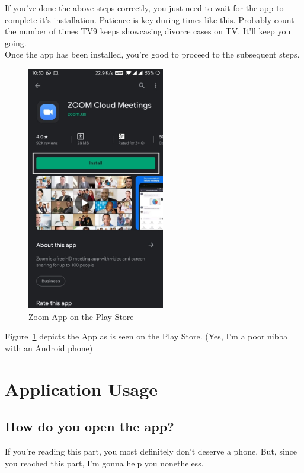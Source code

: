 \documentclass[14pt]{report}
\begin{document}
                    If you've done the above steps correctly, you just need to wait for the app to complete it's installation. Patience is key during times like this. Probably count the number of times TV9 keeps showcasing divorce cases on TV. It'll keep you going.\\

                    Once the app has been installed, you're good to proceed to the subsequent steps.\\
                    \begin{figure}[H]
						\includegraphics[width=6cm]{ZoomApp.jpeg}
						\centering
                        \caption{Zoom App on the Play Store}
                        \label{fig:ZoomApp}
					\end{figure}

                    Figure~\ref{fig:ZoomApp} depicts the App as is seen on the Play Store. (Yes, I'm a poor nibba with an Android phone)
                    
    \newpage
    
    \chapter{Application Usage}\label{chapter3}
		

    \section{How do you open the app?}
                    If you're reading this part, you most definitely don't deserve a phone. But, since you reached this part, I'm gonna help you nonetheless.\\
\end{document}
